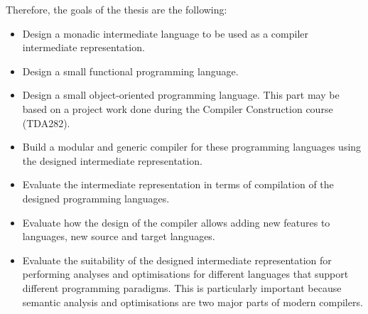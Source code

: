 \documentclass{article}
\begin{document}
Therefore, the goals of the thesis are the following:
\begin{itemize}
  \item Design a monadic intermediate language to be used as a compiler intermediate representation.
  \item Design a small functional programming language.
  \item Design a small object-oriented programming language.
  	This part may be based on a project work done during the Compiler Construction course (TDA282).
  \item Build a modular and generic compiler for these programming languages using the designed intermediate representation.
  \item Evaluate the intermediate representation in terms of compilation of the designed programming languages.
  \item Evaluate how the design of the compiler allows adding new features to languages, new source and target languages.
  \item Evaluate the suitability of the designed intermediate representation for
    performing analyses and optimisations for different languages that support different programming paradigms.
    This is particularly important because semantic analysis and optimisations are two major parts of modern compilers.
\end{itemize}



\end{document}
